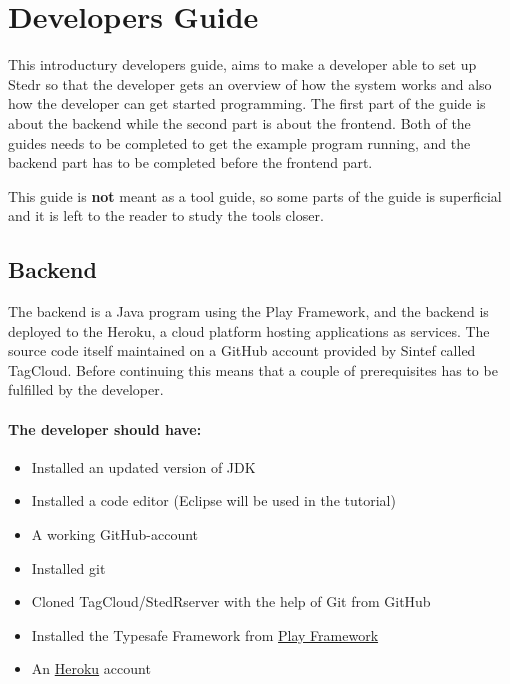 \documentclass[11pt,a4paper,oneside]{article}
\begin{document}
\section{Developers Guide}
This introductury developers guide, aims to make a developer able to set up Stedr so that the developer gets an overview of how the system works and also how the developer can get started programming. The first part of the guide is about the backend while the second part is about the frontend. Both of the guides needs to be completed to get the example program running, and the backend part has to be completed before the frontend part. 

\noindent

This guide is \textbf{not} meant as a tool guide, so some parts of the guide is superficial and it is left to the reader to study the tools closer.

\subsection{Backend}

The backend is a Java program using the Play Framework, and the backend is deployed to the Heroku, a cloud platform hosting applications as services. The source code itself maintained on a GitHub account provided by Sintef called TagCloud. Before continuing this means that a couple of prerequisites has to be fulfilled by the developer.

\paragraph{The developer should have:}
\begin{itemize}
\item Installed an updated version of JDK 
\item Installed a code editor (Eclipse will be used in the tutorial)
\item A working GitHub-account
\item Installed git
\item Cloned TagCloud/StedR\textunderscore server with the help of Git from GitHub
\item Installed the Typesafe Framework from \href{http://www.playframework.com/download}{Play Framework}
\item An \href{https://www.heroku.com/}{Heroku} account 
\end{itemize}  
\end{document}
